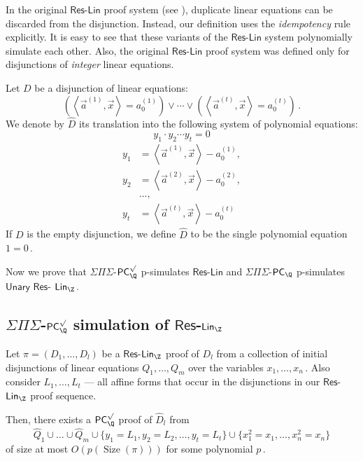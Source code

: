 \documentclass{toc}
\DeclareMathOperator{\Size}{\mathrm{Size}}   %
\begin{document}
\begin{remark}
%
In the original $\mathsf{Res}$-$\mathsf{Lin}$ proof system (see  \cite{RT07}), duplicate linear equations can be discarded from the disjunction. Instead, our definition uses the \emph{idempotency} rule explicitly. It is easy to see that these variants of the $\mathsf{Res}$-$\mathsf{Lin}$ system polynomially simulate each other. Also, the original $\mathsf{Res}$-$\mathsf{Lin}$ proof system was defined only for disjunctions of \emph{integer} linear equations. %
\end{remark}




\begin{definition} 
Let $D$ be  a disjunction of linear equations:
\begin{equation*}
    \left(\left \langle \vec a^{(1)}, \vec x \right \rangle = a_0^{(1)}\right) \vee \cdots 
\vee \left(\left \langle \vec a^{(t)}, \vec x \right \rangle = a_0^{(t)}\right)\,. 
%
\end{equation*}
We denote by $\widehat{D} $ its translation into the following system of polynomial equations:
$$
   y_1 \cdot y_2 \cdots y_t = 0 
$$
\begin{align*}
    y_1 &= \left \langle \vec a^{(1)},  \vec x \right \rangle - a_0^{(1)}, \\ y_2 &=  \left \langle \vec a^{(2)}, \vec x \right \rangle - a_0^{(2)}, \\ &\ldots, \\  y_t &= \left \langle \vec a^{(t)}, \vec x \right \rangle - a_0^{(t)} %
\end{align*}
%
If $D$ is the empty disjunction, we define $\widehat{D} $ to be the single polynomial equation %
$1 = 0\,.$ %
%
\end{definition}

Now we prove that $\Sigma \Pi \Sigma$-$\mathsf{PC}_{\Q}^{\surd}$ p-simulates $\mathsf{Res}$-$\mathsf{Lin}$ and $\Sigma \Pi \Sigma$-$\mathsf{PC}_{\Q}$ p-simulates $\mathsf{Unary}$ $\mathsf{Res}$-%
$\mathsf{Lin}_\Z\,.$ %

\subsection{\texorpdfstring{$\Sigma \Pi \Sigma$-$\mathsf{PC}_\Q^{\surd}$}{SigmaPiSigma-PC-Q-sqrt}
 simulation of \texorpdfstring{$\mathsf{Res}$-$\mathsf{Lin}_{\Z}$}{Res-Lin-Z}}
\begin{theorem}
\label{Res-Lin-b simulation}
%
Let $\pi = (D_1, \ldots, D_l)$ be a $\mathsf{Res}$-$\mathsf{Lin}_{\Z}$ proof  of $D_l$ from a collection of initial disjunctions of linear equations $Q_1, \ldots, Q_m$ over the variables %
$x_1, \ldots, x_n\,.$ %
 Also consider $L_1, \ldots, L_t$ --- all affine forms that occur in the disjunctions in our $\mathsf{Res}$-$\mathsf{Lin}_\Z$ proof sequence. %

Then, there exists a $\mathsf{PC}_{\Q}^{\surd}$ proof of $\widehat{D}_l$ from 
$$
\widehat{Q}_1 \cup \ldots \cup \widehat{Q}_m \cup \{y_1 = L_1, y_2 = L_2, \ldots, y_t = L_t\} \cup \{x_1^2 = x_1, \ldots, x_n^2 = x_n\}
$$ 
of size at most $O(p(\Size(\pi)))$ for some polynomial %
$p\,.$ %
\end{theorem}
\end{document}
